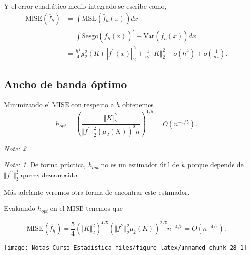 \documentclass[
  12pt,
]{book}
\theoremstyle{definition}
\theoremstyle{definition}
\theoremstyle{definition}
\theoremstyle{remark}
\newtheorem*{remark}{Nota: }
\begin{document}
Y el error cuadrático medio integrado se escribe como,
\begin{align*}
\mathrm{MISE}\left(\hat{f}_{h}\right) & = \int \mathrm{MSE}\left(\hat{f}_{h}(x)\right)dx                                                                                                        \\
& = \int \mathrm{Sesgo}\left(\hat{f}_{h}(x)\right)^{2} + \mathrm{Var}\left(\hat{f}_{h}(x)\right)dx                                                        \\
& = \frac{h^{4}}{4}\mu_{2}^{2}(K)\left\Vert f^{\prime\prime}(x)\right\Vert_{2}^{2} +\frac{1}{nh}\Vert K\Vert_{2}^{2}+o(h^{4})+o\left(\frac{1}{nh}\right).
\end{align*}

\hypertarget{ancho-de-banda-uxf3ptimo}{%
\subsection{Ancho de banda óptimo}\label{ancho-de-banda-uxf3ptimo}}

Minimizando el \(\mathrm{MISE}\) con respecto a \(h\) obtenemos
\begin{equation*}
h_{opt}=\left(\frac{\Vert K\Vert_{2}^{2}}{\Vert f^{\prime\prime}\Vert_{2}^{2}\left(\mu_{2}(K)\right)^{2}n}\right)^{1/5}=O\left( n^{-1/5} \right).
\end{equation*}

\begin{remark}
\begin{remark}

{}De forma práctica, \(h_{opt}\) no es un estimador útil de \(h\) porque depende de \(\Vert f^{\prime\prime}\Vert_{2}^{2}\) que es desconocido.

Más adelante veremos otra forma de encontrar este estimador.

\end{remark}
\end{remark}

Evaluando \(h_{opt}\) en el \(\mathrm{MISE}\) tenemos que

\begin{equation*}
\mathrm{MISE}(\hat{f}_{h})=\frac{5}{4}\left(\Vert K\Vert_{2}^{2}\right)^{4/5}\left(\Vert f^{\prime\prime}\Vert_{2}^{2}\mu_{2}(K)\right)^{2/5}n^{-4/5} = O\left( n^{-4/5} \right).
\end{equation*}

\begin{center}\texttt{[image: Notas-Curso-Estadistica\_files/figure-latex/unnamed-chunk-28-1]} \end{center}
\end{document}

